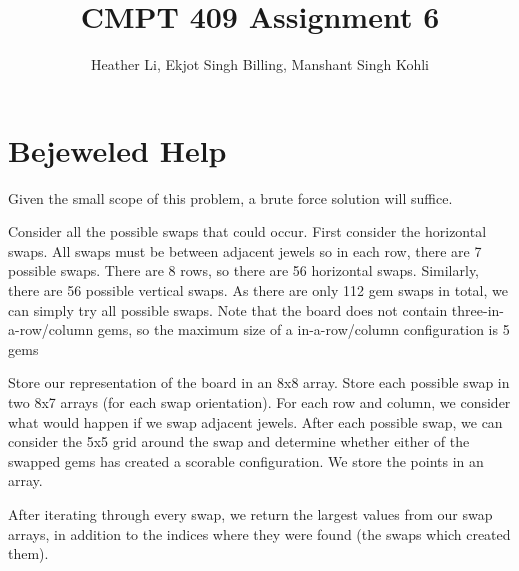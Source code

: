 \documentclass{article}
\title{CMPT 409 Assignment 6}
\author{Heather Li, Ekjot Singh Billing, Manshant Singh Kohli}
\begin{document}
\maketitle

\section{Bejeweled Help}
Given the small scope of this problem, a brute force solution will suffice.
\par 
Consider all the possible swaps that could occur. First consider the horizontal swaps. All swaps must be between adjacent jewels so in each row, there are 7 possible swaps. There are 8 rows, so there are 56 horizontal swaps. Similarly, there are 56 possible vertical swaps. As there are only 112 gem swaps in total, we can simply try all possible swaps. Note that the board does not contain three-in-a-row/column gems, so the maximum size of a in-a-row/column configuration is 5 gems
\par
Store our representation of the board in an 8x8 array. Store each possible swap in two 8x7 arrays (for each swap orientation).  For each row and column, we consider what would happen if we swap adjacent jewels. After each possible swap, we can consider the 5x5 grid around the swap and determine whether either of the swapped gems has created a scorable configuration. We store the points in an array.
\par 
After iterating through every swap, we return the largest values from our swap arrays, in addition to the indices where they were found (the swaps which created them).
\end{document}
